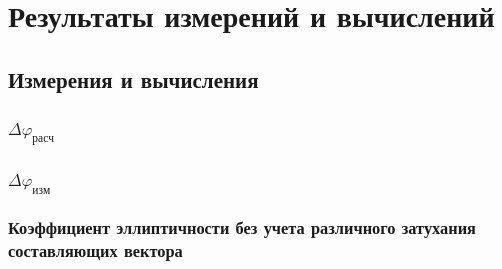 \documentclass[11pt,a4paper,oneside, reqno]{amsproc}
\renewcommand{\phi}{\varphi}
\begin{document}
\newpage
\section{Результаты измерений и вычислений}
\subsection{Измерения и вычисления}
\subsubsection{$\Delta\phi_{расч}$}

\subsubsection{$\Delta\phi_{изм}$}

\subsubsection{Коэффициент эллиптичности без учета различного затухания составляющих вектора}
\end{document}
